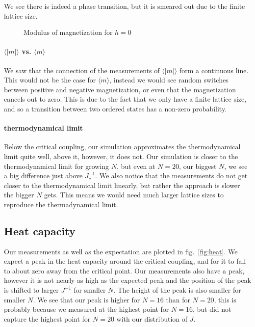 \documentclass{scrartcl}
\begin{document}
We see there is indeed a phase transition, but it is smeared out due to the finite lattice size.
	\begin{figure}[htbp]
		
		\caption{Modulus of magnetization for $h=0$}
		\label{fig:absmag}
	\end{figure}


\paragraph{$\langle |m|\rangle$ vs. $\langle m\rangle$}
We saw that the connection of the measurements of $\langle |m|\rangle$ form a continuous line. This would not be the case for $\langle m\rangle$, instead we would see random switches between positive and negative magnetization, or even that the magnetization cancels out to zero. This is due to the fact that we only have a finite lattice size, and so a transition between two ordered states has a non-zero probability.

\paragraph{thermodynamical limit}

Below the critical coupling, our simulation approximates the thermodynamical limit quite well, above it, however, it does not. Our simulation is closer to the thermodynamical limit for growing $N$, but even at $N=20$, our biggest $N$, we see a big difference just above $J_c^{-1}$. We also notice that the measurements do not get closer to the thermodynamical limit linearly, but rather the approach is slower the bigger $N$ gets. This means we would need much larger lattice sizes to reproduce the thermadynamical limit.

\subsection{Heat capacity}

Our measurements as well as the expectation are plotted in fig.~\ref{fig:heat}. We expect a peak in the heat capacity around the critical coupling, and for it to fall to about zero away from the critical point. Our measurements also have a peak, however it is not nearly as high as the expected peak and the position of the peak is shifted to larger $J^{-1}$ for smaller $N$. The height of the peak is also smaller for smaller $N$. We see that our peak is higher for $N=16$ than for $N=20$, this is probably because we measured at the highest point for $N=16$, but did not capture the highest point for $N=20$ with our distribution of $J$.
\end{document}

